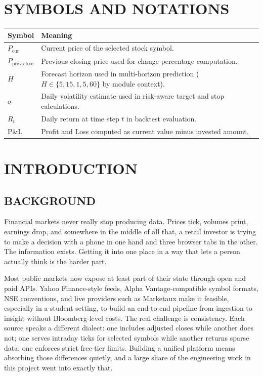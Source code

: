 \documentclass[12pt,a4paper]{report}
\numberwithin{equation}{chapter}
\begin{document}
\chapter*{SYMBOLS AND NOTATIONS}

\begin{longtable}{p{3cm} p{11cm}}
\toprule
\textbf{Symbol} & \textbf{Meaning} \\
\midrule
\endhead
$P_{\text{cur}}$ & Current price of the selected stock symbol. \\
$P_{\text{prev\_close}}$ & Previous closing price used for change-percentage computation. \\
$H$ & Forecast horizon used in multi-horizon prediction ($H \in \{5,15,1,5,60\}$ by module context). \\
$\sigma$ & Daily volatility estimate used in risk-aware target and stop calculations. \\
$R_t$ & Daily return at time step $t$ in backtest evaluation. \\
P\&L & Profit and Loss computed as current value minus invested amount. \\
\bottomrule
\end{longtable}

\clearpage
{}
\setcounter{page}{1}

\chapter{INTRODUCTION}

\section{BACKGROUND}

Financial markets never really stop producing data. Prices tick, volumes print, earnings drop, and somewhere in the middle of all that, a retail investor is trying to make a decision with a phone in one hand and three browser tabs in the other. The information exists. Getting it into one place in a way that lets a person actually think is the harder part.

Most public markets now expose at least part of their state through open and paid APIs. Yahoo Finance-style feeds, Alpha Vantage-compatible symbol formats, NSE conventions, and live providers such as Marketaux make it feasible, especially in a student setting, to build an end-to-end pipeline from ingestion to insight without Bloomberg-level costs. The real challenge is consistency. Each source speaks a different dialect: one includes adjusted closes while another does not; one serves intraday ticks for selected symbols while another returns sparse data; one enforces strict free-tier limits. Building a unified platform means absorbing those differences quietly, and a large share of the engineering work in this project went into exactly that.
\end{document}
